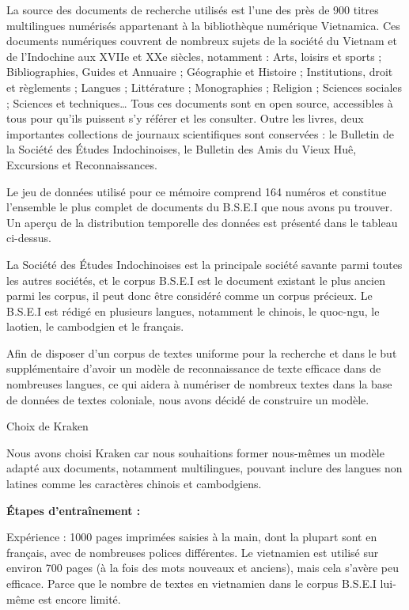  
La source des documents de recherche utilisés est l'une des près de 900 titres multilingues numérisés appartenant à la bibliothèque numérique Vietnamica. Ces documents numériques couvrent de nombreux sujets de la société du Vietnam et de l'Indochine aux XVIIe et XXe siècles, notamment : Arts, loisirs et sports ; Bibliographies, Guides et Annuaire ; Géographie et Histoire ; Institutions, droit et règlements ; Langues ; Littérature ; Monographies ; Religion ; Sciences sociales ; Sciences et techniques… Tous ces documents sont en open source, accessibles à tous pour qu'ils puissent s'y référer et les consulter. Outre les livres, deux importantes collections de journaux scientifiques sont conservées : le Bulletin de la Société des Études Indochinoises, le Bulletin des Amis du Vieux Huê, Excursions et Reconnaissances.

Le jeu de données utilisé pour ce mémoire comprend 164 numéros et constitue l'ensemble le plus complet de documents du B.S.E.I que nous avons pu trouver. Un aperçu de la distribution temporelle des données est présenté dans le tableau ci-dessus.

La Société des Études Indochinoises est la principale société savante parmi toutes les autres sociétés, et le corpus B.S.E.I est le document existant le plus ancien parmi les corpus, il peut donc être considéré comme un corpus précieux. Le B.S.E.I est rédigé en plusieurs langues, notamment le chinois, le quoc-ngu, le laotien, le cambodgien et le français.

Afin de disposer d'un corpus de textes uniforme pour la recherche et dans le but supplémentaire d'avoir un modèle de reconnaissance de texte efficace dans de nombreuses langues, ce qui aidera à numériser de nombreux textes dans la base de données de textes coloniale, nous avons décidé de construire un modèle.

Choix de Kraken 

Nous avons choisi Kraken car nous souhaitions former nous-mêmes un modèle adapté aux documents, notamment multilingues, pouvant inclure des langues non latines comme les caractères chinois et cambodgiens.

\textbf{Étapes d'entraînement :}

Expérience : 1000 pages imprimées saisies à la main, dont la plupart sont en français, avec de nombreuses polices différentes. Le vietnamien est utilisé sur environ 700 pages (à la fois des mots nouveaux et anciens), mais cela s'avère peu efficace. Parce que le nombre de textes en vietnamien dans le corpus B.S.E.I lui-même est encore limité.

